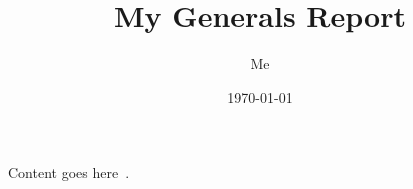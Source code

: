 \documentclass[11 pt,letterpaper]{article}
\title{My Generals Report}
\author{Me}
\date{\today}
\begin{document}
\maketitle

\onehalfspacing

Content goes here~\cite{famous-paper}.

\singlespacing
{}

\end{document}
